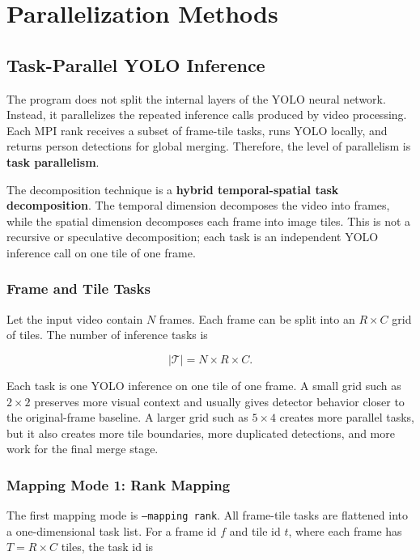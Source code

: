 \chapter{Parallelization Methods}

\section{Task-Parallel YOLO Inference}

The program does not split the internal layers of the YOLO neural network. Instead, it parallelizes the repeated inference calls produced by video processing. Each MPI rank receives a subset of frame-tile tasks, runs YOLO locally, and returns person detections for global merging. Therefore, the level of parallelism is \textbf{task parallelism}.

The decomposition technique is a \textbf{hybrid temporal-spatial task decomposition}. The temporal dimension decomposes the video into frames, while the spatial dimension decomposes each frame into image tiles. This is not a recursive or speculative decomposition; each task is an independent YOLO inference call on one tile of one frame.

\subsection{Frame and Tile Tasks}

Let the input video contain $N$ frames. Each frame can be split into an $R \times C$ grid of tiles. The number of inference tasks is

\[
|\mathcal{T}| = N \times R \times C.
\]

Each task is one YOLO inference on one tile of one frame. A small grid such as $2 \times 2$ preserves more visual context and usually gives detector behavior closer to the original-frame baseline. A larger grid such as $5 \times 4$ creates more parallel tasks, but it also creates more tile boundaries, more duplicated detections, and more work for the final merge stage.

\subsection{Mapping Mode 1: Rank Mapping}

The first mapping mode is \texttt{--mapping rank}. All frame-tile tasks are flattened into a one-dimensional task list. For a frame id $f$ and tile id $t$, where each frame has $T = R \times C$ tiles, the task id is

